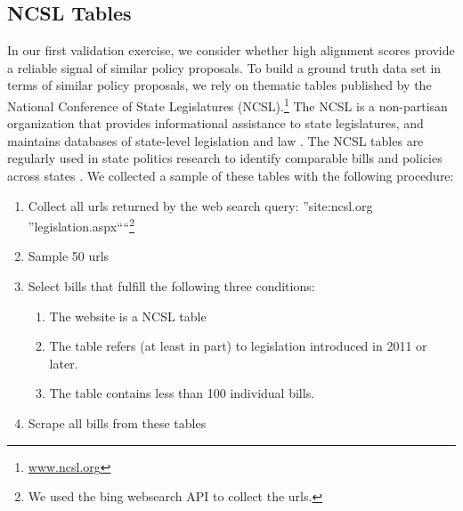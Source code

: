 \documentclass[12pt]{article} %
\begin{document}
\subsection{NCSL Tables}

In our first validation exercise, we consider whether high alignment scores provide a reliable signal of similar policy proposals. To build a ground truth data set in terms of similar policy proposals, we rely on thematic tables published by the National Conference of State Legislatures (NCSL).\footnote{\url{www.ncsl.org}} The NCSL is a non-partisan organization that provides informational assistance to state legislatures, and maintains databases of state-level legislation and law \citep{rivera2014immigration}.  The NCSL tables are regularly used in state politics research to identify comparable bills and policies across states \citep[see, e.g., ][]{marquez2013hispanic,witmer2014american,commins2016reappraising,ybarra2016anti, brown2013foreclosing}. We collected a sample of these tables with the following procedure:

\begin{singlespacing}

\begin{enumerate}
    \item Collect all urls returned by the web search query: ''site:ncsl.org ''legislation.aspx````\footnote{We used the bing websearch API to collect the urls.}
    \item Sample 50 urls
    \item Select bills that fulfill the following three conditions:
        \begin{enumerate}
            \item The website is a NCSL table
            \item The table refers (at least in part) to legislation introduced in 2011 or later.          
             \item The table contains less than 100 individual bills. 
        \end{enumerate}
    \item Scrape all bills from these tables
\end{enumerate}

\end{singlespacing}
\end{document}
